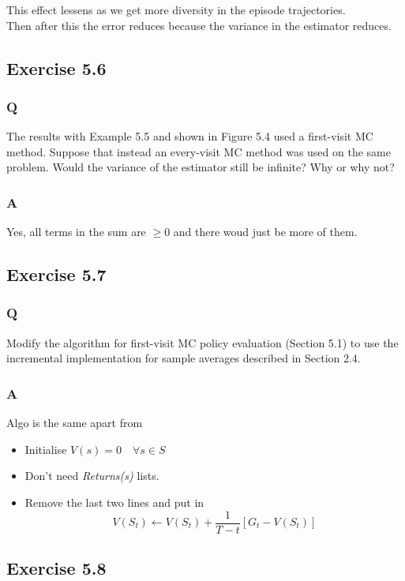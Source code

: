 This effect lessens as we get more diversity in the episode trajectories.\\

Then after this the error reduces because the variance in the estimator reduces.

\subsection{Exercise 5.6}
\subsubsection*{Q}
The results with Example 5.5 and shown in Figure 5.4 used a first-visit MC method. Suppose that instead an every-visit MC method was used on the same problem. Would the variance of the estimator still be infinite? Why or why not?
\subsubsection*{A}
Yes, all terms in the sum are $\geq 0$ and there woud just be more of them.

\subsection{Exercise 5.7}
\subsubsection*{Q}
Modify the algorithm for first-visit MC policy evaluation (Section 5.1) to use the incremental implementation for sample averages described in Section 2.4.

\subsubsection*{A}
Algo is the same apart from 
\begin{itemize}
    \item Initialise $V(s) = 0 \quad \forall s \in S$
    \item Don't need \emph{Returns(s)} lists.
    \item Remove the last two lines and put in \[ V(S_t) \leftarrow V(S_t) + \frac{1}{T- t}[ G_t - V(S_t) ] \]
\end{itemize}

\subsection{Exercise 5.8}
